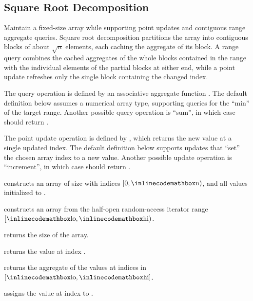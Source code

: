 \subsection{Square Root Decomposition}
\label{sec:2.5.3}
Maintain a fixed-size array while supporting point updates and contiguous range aggregate queries. Square root decomposition partitions the array into contiguous blocks of about $\sqrt{n}$ elements, each caching the aggregate of its block. A range query combines the cached aggregates of the whole blocks contained in the range with the individual elements of the partial blocks at either end, while a point update refreshes only the single block containing the changed index.

The query operation is defined by an associative aggregate function . The default definition below assumes a numerical array type, supporting queries for the ``min'' of the target range. Another possible query operation is ``sum'', in which case  should return .

The point update operation is defined by , which returns the new value at a single updated index. The default definition below supports updates that ``set'' the chosen array index to a new value. Another possible update operation is ``increment'', in which case  should return .

\begin{compactitem}
  \item {} constructs an array of size  with indices $[0, {\inlinecodemath{n}})$, and all values initialized to .
  \item {} constructs an array from the half-open random-access iterator range $[{\inlinecodemath{lo}}, {\inlinecodemath{hi}})$.
  \item {} returns the size of the array.
  \item {} returns the value at index .
  \item {} returns the aggregate of the values at indices in $[{\inlinecodemath{lo}}, {\inlinecodemath{hi}}]$.
  \item {} assigns the value  at index  to .
\end{compactitem}

